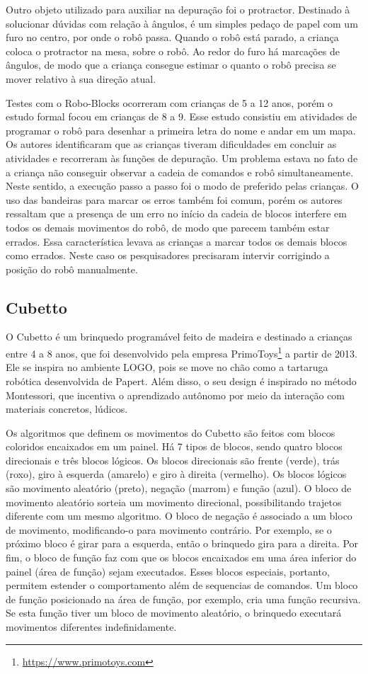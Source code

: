 Outro objeto utilizado para auxiliar na depuração foi o protractor. Destinado à solucionar dúvidas com relação à ângulos, é um simples pedaço de papel com um furo no centro, por onde o robô passa. Quando o robô está parado, a criança coloca o protractor na mesa, sobre o robô. Ao redor do furo há marcações de ângulos, de modo que a criança consegue estimar o quanto o robô precisa se mover relativo à sua direção atual.

Testes com o Robo-Blocks ocorreram com crianças de 5 a 12 anos, porém o estudo formal focou em crianças de 8 a 9. Esse estudo consistiu em atividades de programar o robô para desenhar a primeira letra do nome e andar em um mapa. Os autores identificaram que as crianças tiveram dificuldades em concluir as atividades e recorreram às funções de depuração. Um problema estava no fato de a criança não conseguir observar a cadeia de comandos e robô simultaneamente. Neste sentido, a execução passo a passo foi o modo de preferido pelas crianças. O uso das bandeiras para marcar os erros também foi comum, porém os autores ressaltam que a presença de um erro no início da cadeia de blocos interfere em todos os demais movimentos do robô, de modo que parecem também estar errados. Essa característica levava as crianças a marcar todos os demais blocos como errados. Neste caso os pesquisadores precisaram intervir corrigindo a posição do robô manualmente.

\subsection{Cubetto}
\label{sub_sec:cubetto}
O Cubetto é um brinquedo programável feito de madeira e destinado a crianças entre 4 a 8 anos, que foi desenvolvido pela empresa PrimoToys\footnote{\url{https://www.primotoys.com}} a partir de 2013. Ele se inspira no ambiente LOGO, pois se move no chão como a tartaruga robótica desenvolvida de Papert. Além disso, o seu design é inspirado no método Montessori, que incentiva o aprendizado autônomo por meio da interação com materiais concretos, lúdicos.

Os algoritmos que definem os movimentos do Cubetto são feitos com blocos coloridos encaixados em um painel. Há 7 tipos de blocos, sendo quatro blocos direcionais e três blocos lógicos. Os blocos direcionais são frente (verde), trás (roxo), giro à esquerda (amarelo) e giro à direita (vermelho). Os blocos lógicos são movimento aleatório (preto), negação (marrom) e função (azul). O bloco de movimento aleatório sorteia um movimento direcional, possibilitando trajetos diferente com um mesmo algoritmo. O bloco de negação é associado a um bloco de movimento, modificando-o para movimento contrário. Por exemplo, se o próximo bloco é girar para a esquerda, então o brinquedo gira para a direita. Por fim, o bloco de função faz com que os blocos encaixados em uma área inferior do painel (área de função) sejam executados. Esses blocos especiais, portanto, permitem estender o comportamento além de sequencias de comandos. Um bloco de função posicionado na área de função, por exemplo, cria uma função recursiva. Se esta função tiver um bloco de movimento aleatório, o brinquedo executará movimentos diferentes indefinidamente.

